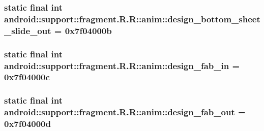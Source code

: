 \hypertarget{classandroid_1_1support_1_1fragment_1_1_r_1_1anim_98a04a43a861bacc000a996ecc2d3804}{
\subsubsection[{design\_\-bottom\_\-sheet\_\-slide\_\-out}]{\setlength{\rightskip}{0pt plus 5cm}static final int android::support::fragment.R.R::anim::design\_\-bottom\_\-sheet\_\-slide\_\-out = 0x7f04000b}}
\label{classandroid_1_1support_1_1fragment_1_1_r_1_1anim_98a04a43a861bacc000a996ecc2d3804}


\hypertarget{classandroid_1_1support_1_1fragment_1_1_r_1_1anim_86ca270a61b8c983ea606c79da6979e6}{
\subsubsection[{design\_\-fab\_\-in}]{\setlength{\rightskip}{0pt plus 5cm}static final int android::support::fragment.R.R::anim::design\_\-fab\_\-in = 0x7f04000c}}
\label{classandroid_1_1support_1_1fragment_1_1_r_1_1anim_86ca270a61b8c983ea606c79da6979e6}


\hypertarget{classandroid_1_1support_1_1fragment_1_1_r_1_1anim_3bf54f050ef4c3db0827d207c5ed1755}{
\subsubsection[{design\_\-fab\_\-out}]{\setlength{\rightskip}{0pt plus 5cm}static final int android::support::fragment.R.R::anim::design\_\-fab\_\-out = 0x7f04000d}}
\label{classandroid_1_1support_1_1fragment_1_1_r_1_1anim_3bf54f050ef4c3db0827d207c5ed1755}



